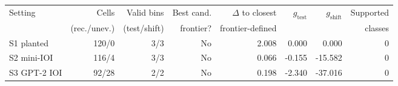 \begin{tabular}{lrrrrrrr}
\toprule
Setting & Cells & Valid bins & Best cand. & $\Delta$ to closest & $g_{\text{test}}$ & $g_{\text{shift}}$ & Supported \\
 & (rec./unev.) & (test/shift) & frontier? & frontier-defined &  &  & classes \\
\midrule
S1 planted & 120/0 & 3/3 & No & 2.008 & 0.000 & 0.000 & 0 \\
S2 mini-IOI & 116/4 & 3/3 & No & 0.066 & -0.155 & -15.582 & 0 \\
S3 GPT-2 IOI & 92/28 & 2/2 & No & 0.198 & -2.340 & -37.016 & 0 \\
\bottomrule
\end{tabular}
